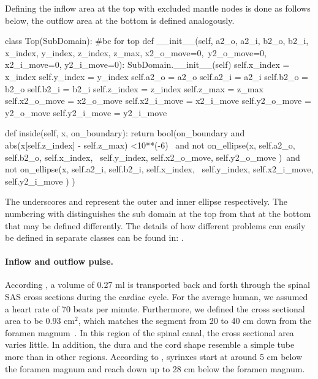 Defining the inflow area at the top with excluded mantle nodes is done as follows below, the outflow area at the bottom is defined analogously.

\begin{code}
class Top(SubDomain):	#bc for top
	def __init__(self, a2_o, a2_i, b2_o, b2_i,  x_index, y_index, z_index, z_max, x2_o_move=0,\
				 y2_o_move=0, x2_i_move=0, y2_i_move=0):
		SubDomain.__init__(self)
		self.x_index = x_index
		self.y_index = y_index
		self.a2_o = a2_o
		self.a2_i = a2_i
		self.b2_o = b2_o
		self.b2_i = b2_i
		self.z_index = z_index
		self.z_max = z_max
		self.x2_o_move = x2_o_move
		self.x2_i_move = x2_i_move
		self.y2_o_move = y2_o_move
		self.y2_i_move = y2_i_move

	def inside(self, x, on_boundary):
		return bool(on_boundary and abs(x[self.z_index] - self.z_max) <10**(-6) \
                       and not on_ellipse(x, self.a2_o, self.b2_o, self.x_index,  \
                           self.y_index, self.x2_o_move, self.y2_o_move )\
                       and not on_ellipse(x, self.a2_i, self.b2_i, self.x_index, \ 
                           self.y_index, self.x2_i_move, self.y2_i_move ) ) 
\end{code}

The underscores \emp{o} and \emp{i} represent the outer and inner
ellipse respectively. The numbering with \emp{2} distinguishes the sub
domain at the top from that at the bottom that may be defined
differently. The details of how different problems can easily be
defined in separate classes can be found in:
\emp{src/mesh\_definitions/}. %

\paragraph{Inflow and outflow pulse.} According \cite{Gupta2009}, a volume of 0.27 ml is transported back and forth through the spinal SAS cross sections during the cardiac cycle. For the average human, we assumed a heart rate of 70 beats per minute. Furthermore, we defined the cross sectional area to be 0.93 $\mathrm{cm^2}$, which matches the segment from 20 to 40 cm down from the foramen magnum~\cite{Loth2001}. In this region of the spinal canal, the cross sectional area varies little. In addition, the dura and the cord shape resemble a simple tube more than in other regions. According to \cite{Oldfield1994}, syrinxes start at around 5 cm below the foramen magnum and reach down up to 28 cm below the foramen magnum. 

